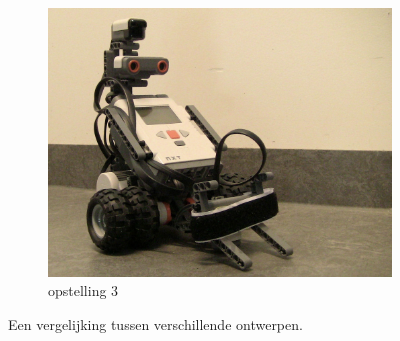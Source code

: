 \documentclass[tt2]{penoverslag}
\begin{document}
\begin{figure}
\begin{subfigure}[h]{0.325\textwidth}
		\includegraphics[width=\textwidth]{robotNieuw}
	\caption{opstelling 3}
	\end{subfigure}
\caption{Een vergelijking tussen verschillende ontwerpen.}
\label{fig:robotBouw}
\end{figure}
\end{document}
